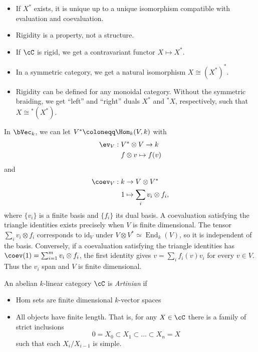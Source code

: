 \begin{remark}
\hfill
\begin{itemize}
    \item If $X^*$ exists, it is unique up to a unique isomorphism compatible with evaluation and coevaluation. 
    \item Rigidity is a property, not a structure.
    \item If $\cC$ is rigid, we get a contravariant functor $X \mapsto X^*$.
    \item In a symmetric category, we get a natural isomorphism $X \cong (X^*)^*$.
    \item Rigidity can be defined for any monoidal category. Without the symmetric braiding, we get ``left'' and ``right'' duals $X^*$ and ${^*X}$, respectively, such that $X \cong {^*(X^*)}$.
\end{itemize}
\end{remark}
\begin{example}
    In $\bVec_k$, we can let $V^* \coloneqq \Hom_k(V, k)$ with
    \begin{align*}
        \ev_V: \hspace{1mm} &V^* \otimes V \to k \\
        &f \otimes v \mapsto f(v)
    \end{align*}
    and
    \begin{align*}
        \coev_V: k & \to V \otimes V^* \\
        1&\mapsto\sum_i v_i\otimes f_i,
    \end{align*}
    where $\{v_i\}$ is a finite basis and $\{f_i\}$ its dual basis. A coevaluation satisfying the triangle identities exists precisely when $V$ is finite dimensional.
    The tensor $\sum_i v_i\otimes f_i$ corresponds to $\mathrm{id}_V$ under $V\otimes V^*\simeq\operatorname{End}_k(V)$, so it is independent of the basis. Conversely, if a coevaluation satisfying the triangle identities has $\coev(1)=\sum_{i=1}^m v_i\otimes f_i$, the first identity gives $v=\sum_i f_i(v)v_i$ for every $v\in V$. Thus the $v_i$ span and $V$ is finite dimensional.
\end{example}
\begin{definition}
    An abelian $k$-linear category $\cC$ is \textit{Artinian} if
    \begin{itemize}
        \item[1)] Hom sets are finite dimensional $k$-vector spaces
        \item[2)] All objects have finite length. That is, for any $X \in \cC$ there is a family of strict inclusions
        \[0=X_0 \subset X_1 \subset \dots \subset X_n = X\]
        such that each $X_i/X_{i-1}$ is simple.
    \end{itemize}
\end{definition}
